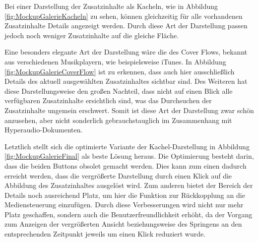 Bei einer Darstellung der Zusatzinhalte als Kacheln, wie in Abbildung \ref{fig:MockupGalerieKacheln} zu sehen, können gleichzeitig für alle vorhandenen Zusatzinhalte Details angezeigt werden. Durch diese Art der Darstellung passen jedoch noch weniger Zusatzinhalte auf die gleiche Fläche.

Eine besonders elegante Art der Darstellung wäre die des Cover Flows, bekannt aus verschiedenen Musikplayern, wie beispielsweise iTunes. In Abbildung \ref{fig:MockupGalerieCoverFlow} ist zu erkennen, dass auch hier ausschließlich Details des aktuell ausgewählten Zusatzinhaltes sichtbar sind. Des Weiteren hat diese Darstellungsweise den großen Nachteil, dass nicht auf einen Blick alle verfügbaren Zusatzinhalte ersichtlich sind, was das Durchsuchen der Zusatzinhalte ungemein erschwert. Somit ist diese Art der Darstellung zwar schön anzusehen, aber nicht sonderlich gebrauchstauglich im Zusammenhang mit Hyperaudio-Dokumenten.

Letztlich stellt sich die optimierte Variante der Kachel-Darstellung in Abbildung \ref{fig:MockupGalerieFinal} als beste Lösung heraus. Die Optimierung besteht darin, dass die beiden Buttons obsolet gemacht werden. Dies kann zum einen dadurch erreicht werden, dass die vergrößerte Darstellung durch einen Klick auf die Abbildung des Zusatzinhaltes ausgelöst wird. Zum anderen bietet der Bereich der Details noch ausreichend Platz, um hier die Funktion zur Rückkopplung an die Mediensteuerung einzufügen. Durch diese Verbesserungen wird nicht nur mehr Platz geschaffen, sondern auch die Benutzerfreundlichkeit erhöht, da der Vorgang zum Anzeigen der vergrößerten Ansicht beziehungsweise des Springens an den entsprechenden Zeitpunkt jeweils um einen Klick reduziert wurde.

